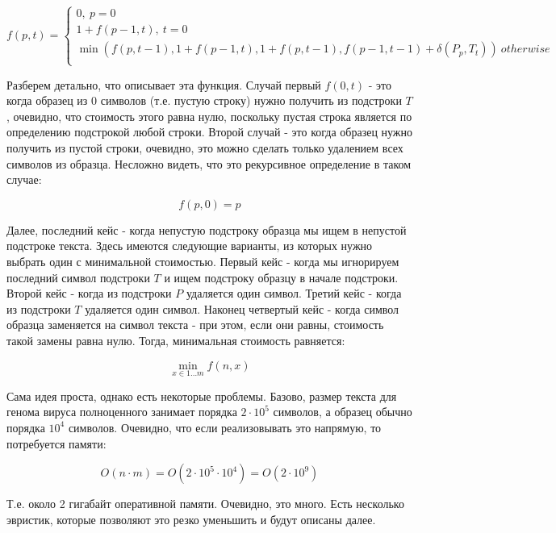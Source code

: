 \documentclass[11pt,a4paper,oneside]{article}
\begin{document}
\begin{equation}
	f(p,t) = \begin{cases}
	0,\ p = 0\\
	1+f(p-1,t),\ t = 0\\
	\min(f(p,t-1), 1+f(p-1,t), 1+f(p,t-1), f(p-1,t-1)+\delta(P_p,T_t) )\ otherwise\\
	\end{cases} 
\end{equation}

Разберем детально, что описывает эта функция. Случай первый $f(0,t)$ - это когда образец из 0 символов (т.е. пустую строку) нужно получить из подстроки $T$, очевидно, что стоимость этого равна нулю, поскольку пустая строка является по определению подстрокой любой строки. Второй случай - это когда образец нужно получить из пустой строки, очевидно, это можно сделать только удалением всех символов из образца. Несложно видеть, что это рекурсивное определение в таком случае:

\begin{equation}
	f(p,0) = p
\end{equation}

Далее, последний кейс - когда непустую подстроку образца мы ищем в непустой подстроке текста. Здесь имеются следующие варианты, из которых нужно выбрать один с минимальной стоимостью. Первый кейс - когда мы игнорируем последний символ подстроки $T$ и ищем подстроку образцу в начале подстроки. Второй кейс - когда из подстроки $P$ удаляется один символ. Третий кейс - когда из подстроки $T$ удаляется один символ. Наконец четвертый кейс - когда символ образца заменяется на символ текста - при этом, если они равны, стоимость такой замены равна нулю. Тогда, минимальная стоимость равняется:

\begin{equation}
	\min_{x\in 1\ldots m} f(n,x)
\end{equation}

Сама идея проста, однако есть некоторые проблемы. Базово, размер текста для генома вируса полноценного занимает порядка $2\cdot 10^5$ символов, а образец обычно порядка $10^4$ символов. Очевидно, что если реализовывать это напрямую, то потребуется памяти:

\begin{equation}
	O(n\cdot m) = O(2\cdot 10^5\cdot 10^4) = O(2\cdot 10^9)
\end{equation}

Т.е. около 2 гигабайт оперативной памяти. Очевидно, это много. Есть несколько эвристик, которые позволяют это резко уменьшить и будут описаны далее.
\end{document}
